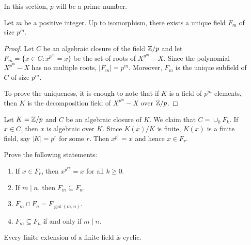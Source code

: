 \chapter{}


In this section, $p$ will be a prime number. 

\begin{proposition}
    Let $m$ be a positive integer. 
    Up to isomorphism, there exists a unique 
    field $F_m$ of size $p^m$. 
\end{proposition}

\begin{proof}
    Let $C$ be an algebraic closure of the field $\mathbb{Z}/p$ and 
    let $F_m=\{x\in C:x^{p^m}=x\}$ be the set of roots of $X^{p^m}-X$. Since 
    the polynomial $X^{p^m}-X$ has no multiple roots, $|F_m|=p^m$. Moreover, 
    $F_m$ is the unique subfield of $C$ of size $p^m$. 
    
    To prove the uniqueness, it is enough to note that 
    if $K$ is a field of $p^m$ elements, then
    $K$ is the decomposition field of $X^{p^m}-X$ over $\mathbb{Z}/p$.  
\end{proof}

Let $K=\mathbb{Z}/p$ and $C$ be an algebraic closure of $K$. 
We claim that $C=\cup_k F_k$. If $x\in C$, then $x$ is algebraic over $K$. 
Since $K(x)/K$ is finite, $K(x)$ is a finite field, say 
$|K|=p^r$ for some $r$. Then $x^{p^r}=x$ and hence $x\in F_r$. 

\begin{exercise}
    Prove the following statements:
    \begin{enumerate}
        \item If $x\in F_r$, then $x^{p^{rk}}=x$ for all $k\geq0$.
        \item If $m\mid n$, then $F_m\subseteq F_n$. 
        \item $F_m\cap F_n=F_{\gcd(m,n)}$.
        \item $F_m\subseteq F_n$ if and only if $m\mid n$. 
    \end{enumerate}
\end{exercise}

\begin{proposition}
    Every finite extension of a finite field is cyclic. 
\end{proposition}

